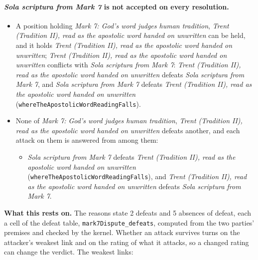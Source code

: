 \documentclass[11pt]{article}
\begin{document}
\paragraph{\emph{Sola scriptura from Mark 7} is not accepted on every resolution.}
\begin{itemize}
\item A position holding \emph{Mark 7: God's word judges human tradition}, \emph{Trent (Tradition II), read as the apostolic word handed on unwritten} can be held, and it holds \emph{Trent (Tradition II), read as the apostolic word handed on unwritten}; \emph{Trent (Tradition II), read as the apostolic word handed on unwritten} conflicts with \emph{Sola scriptura from Mark 7}: \emph{Trent (Tradition II), read as the apostolic word handed on unwritten} defeats \emph{Sola scriptura from Mark 7}, and \emph{Sola scriptura from Mark 7} defeats \emph{Trent (Tradition II), read as the apostolic word handed on unwritten} (\texttt{where\allowbreak{}The\allowbreak{}Apostolic\allowbreak{}Word\allowbreak{}Reading\allowbreak{}Falls}).
\item None of \emph{Mark 7: God's word judges human tradition}, \emph{Trent (Tradition II), read as the apostolic word handed on unwritten} defeats another, and each attack on them is answered from among them:
\begin{itemize}
\item \emph{Sola scriptura from Mark 7} defeats \emph{Trent (Tradition II), read as the apostolic word handed on unwritten} (\texttt{where\allowbreak{}The\allowbreak{}Apostolic\allowbreak{}Word\allowbreak{}Reading\allowbreak{}Falls}), and \emph{Trent (Tradition II), read as the apostolic word handed on unwritten} defeats \emph{Sola scriptura from Mark 7}.
\end{itemize}
\end{itemize}
\par\noindent\textbf{What this rests on.} The reasons state 2 defeats and 5 absences of defeat, each a cell of the defeat table, \texttt{mark7\allowbreak{}Dispute\_\allowbreak{}defeats}, computed from the two parties' premises and checked by the kernel. Whether an attack survives turns on the attacker's weakest link and on the rating of what it attacks, so a changed rating can change the verdict. The weakest links:
\end{document}
